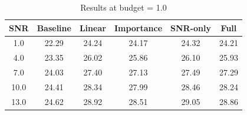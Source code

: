 \begin{table}[h]
\centering
\caption{Results at budget = 1.0}
\begin{tabular}{c|ccccc}
\hline
SNR & Baseline & Linear & Importance & SNR-only & Full \\
\hline
1.0 & 22.29 & 24.24 & 24.17 & 24.32 & 24.21 \\
4.0 & 23.35 & 26.02 & 25.86 & 26.10 & 25.93 \\
7.0 & 24.03 & 27.40 & 27.13 & 27.49 & 27.29 \\
10.0 & 24.41 & 28.34 & 27.99 & 28.46 & 28.24 \\
13.0 & 24.62 & 28.92 & 28.51 & 29.05 & 28.86 \\
\hline
\end{tabular}
\end{table}

